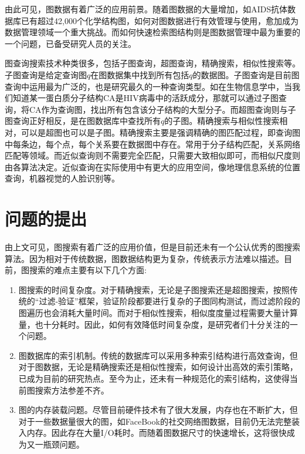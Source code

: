 \documentclass{XDBAthesis}
\begin{document}
由此可见，图数据有着广泛的应用前景。随着图数据的大量增加，如AIDS抗体数据库已有超过42,000个化学结构图，如何对图数据进行有效管理与使用，愈加成为数据管理领域一个重大挑战。而如何快速检索图结构则是图数据管理中最为重要的一个问题，已备受研究人员的关注。

图查询搜索技术种类很多，包括子图查询，超图查询，精确搜索，相似性搜索等\cite{g13}。子图查询是给定查询图$q$在图数据集中找到所有包括$q$的数据图。子图查询是目前图查询中运用最为广泛的，也是研究最久的一种查询类型。如在生物信息学中\cite{g13}，当我们知道某一蛋白质分子结构CA是HIV病毒中的活跃成分，那就可以通过子图查询，将CA作为查询图，找出所有包含该分子结构的大型分子。而超图查询则与子图查询正好相反，是在图数据库中查找所有$q$的子图。精确搜索与相似性搜索相对，可以是超图也可以是子图。精确搜索主要是强调精确的图匹配过程，即查询图中每条边，每个点，每个关系要在数据图中存在。常用于分子结构匹配，关系网络匹配等领域。而近似查询则不需要完全匹配，只需要大致相似即可，而相似尺度则由各算法决定。近似查询在实际使用中有更大的应用空间，像地理信息系统的位置查询，机器视觉的人脸识别等\cite{g13}。
\section{问题的提出}
由上文可见，图搜索有着广泛的应用价值，但是目前还未有一个公认优秀的图搜索算法。因为相对于传统数据，图数据结构更为复杂，传统表示方法难以描述。目前，图搜索的难点主要有以下几个方面:
\begin{enumerate}
    \item 图搜索的时间复杂度。对于精确搜索，无论是子图搜索还是超图搜索，按照传统的“过滤-验证”框架，验证阶段都要进行复杂的子图同构测试，而过滤阶段的图遍历也会消耗大量时间。而对于相似性搜索，相似度度量过程需要大量计算量，也十分耗时。因此，如何有效降低时间复杂度，是研究者们十分关注的一个问题。
    \item 图数据库的索引机制。传统的数据库可以采用多种索引结构进行高效查询，但对于图数据，无论是精确搜索还是相似性搜索，如何设计出高效的索引策略，已成为目前的研究热点。至今为止，还未有一种规范化的索引结构，这使得当前图搜索方法参差不齐。
    \item 图的内存装载问题。尽管目前硬件技术有了很大发展，内存也在不断扩大，但对于一些数据量很大的图，如FaceBook的社交网络图数据，目前仍无法完整装入内存。因此存在大量I/O耗时。而随着图数据尺寸的快速增长，这将很快成为又一瓶颈问题。
\end{enumerate}
\end{document}
